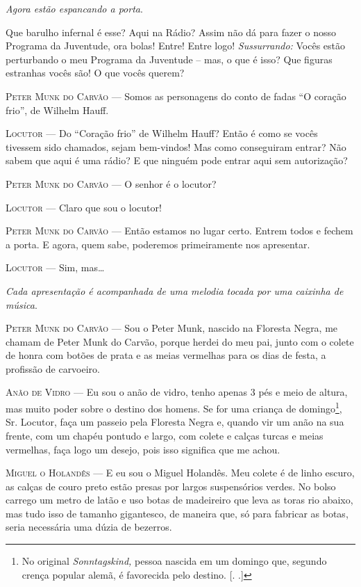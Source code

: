 \emph{Agora estão espancando a porta}.

Que barulho infernal é esse? Aqui na Rádio? Assim não dá para fazer o
nosso Programa da Juventude, ora bolas! Entre! Entre logo!
\emph{Sussurrando:} Vocês estão perturbando o meu Programa da Juventude
-- mas, o que é isso? Que figuras estranhas vocês são! O que vocês
querem?

\textsc{Peter Munk do Carvão} --- Somos as personagens do conto de fadas ``O
coração frio'', de Wilhelm Hauff.

\textsc{Locutor} --- Do ``Coração frio'' de Wilhelm Hauff? Então é como se vocês
tivessem sido chamados, sejam bem-vindos! Mas como conseguiram entrar?
Não sabem que aqui é uma rádio? E que ninguém pode entrar aqui sem
autorização?

\textsc{Peter Munk do Carvão} --- O senhor é o locutor?

\textsc{Locutor} --- Claro que sou o locutor!

\textsc{Peter Munk do Carvão} --- Então estamos no lugar certo. Entrem todos e
fechem a porta. E agora, quem sabe, poderemos primeiramente nos
apresentar.

\textsc{Locutor} --- Sim, mas\ldots{}

\emph{Cada apresentação é acompanhada de uma melodia tocada por uma
caixinha de música}.

\textsc{Peter Munk do Carvão} --- Sou o Peter Munk, nascido na Floresta Negra, me
chamam de Peter Munk do Carvão, porque herdei do meu pai, junto com o
colete de honra com botões de prata e as meias vermelhas para os dias de
festa, a profissão de carvoeiro.

\textsc{Anão de Vidro} --- Eu sou o anão de vidro, tenho apenas 3 pés e meio de
altura, mas muito poder sobre o destino dos homens. Se for uma criança
de domingo\footnote{No original \emph{Sonntagskind,} pessoa nascida em
  um domingo que, segundo crença popular alemã, é favorecida pelo
  destino. [. .]}, Sr. Locutor, faça um passeio pela Floresta
Negra e, quando vir um anão na sua frente, com um chapéu pontudo e
largo, com colete e calças turcas e meias vermelhas, faça logo um
desejo, pois isso significa que me achou.

\textsc{Miguel o Holandês} --- E eu sou o Miguel Holandês. Meu colete é de linho
escuro, as calças de couro preto estão presas por largos suspensórios
verdes. No bolso carrego um metro de latão e uso botas de madeireiro que
leva as toras rio abaixo, mas tudo isso de tamanho gigantesco, de
maneira que, só para fabricar as botas, seria necessária uma dúzia de
bezerros.

